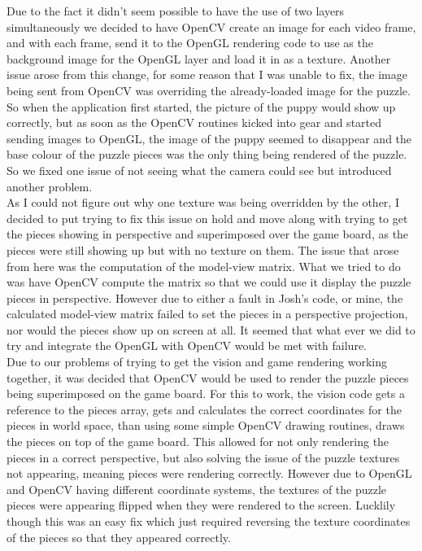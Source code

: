 \documentclass{article}
\begin{document}
Due to the fact it didn't seem possible to have the use of two layers
simultaneously we decided to have OpenCV create an image for each video frame,
and with each frame, send it to the OpenGL rendering code to use as the
background image for the OpenGL layer and load it in as a texture. Another issue
arose from this change, for some reason that I was unable to fix, the image
being sent from OpenCV was overriding the already-loaded image for the
puzzle. So when the application first started, the picture of the puppy would
show up correctly, but as soon as the OpenCV routines kicked into gear and
started sending images to OpenGL, the image of the puppy seemed to disappear and
the base colour of the puzzle pieces was the only thing being rendered of the
puzzle. So we fixed one issue of not seeing what the camera could see but
introduced another problem.\\

As I could not figure out why one texture was being overridden by the other, I
decided to put trying to fix this issue on hold and move along with trying to
get the pieces showing in perspective and superimposed over the game board, as
the pieces were still showing up but with no texture on them. The issue that
arose from here was the computation of the model-view matrix. What we tried to
do was have OpenCV compute the matrix so that we could use it display the puzzle
pieces in perspective. However due to either a fault in Josh's code, or mine,
the calculated model-view matrix failed to set the pieces in a perspective
projection, nor would the pieces show up on screen at all. It seemed that what
ever we did to try and integrate the OpenGL with OpenCV would be met with
failure.\\

Due to our problems of trying to get the vision and game rendering working
together, it was decided that OpenCV would be used to render the puzzle pieces
being superimposed on the game board. For this to work, the vision code gets a
reference to the pieces array, gets and calculates the correct coordinates for
the pieces in world space, than using some simple OpenCV drawing routines, draws
the pieces on top of the game board. This allowed for not only rendering the
pieces in a correct perspective, but also solving the issue of the puzzle
textures not appearing, meaning pieces were rendering correctly. However due to
OpenGL and OpenCV having different coordinate systems, the textures of the
puzzle pieces were appearing flipped when they were rendered to the screen.
Lucklily though this was an easy fix which just required reversing the texture
coordinates of the pieces so that they appeared correctly.\\
\fi
\end{document}
